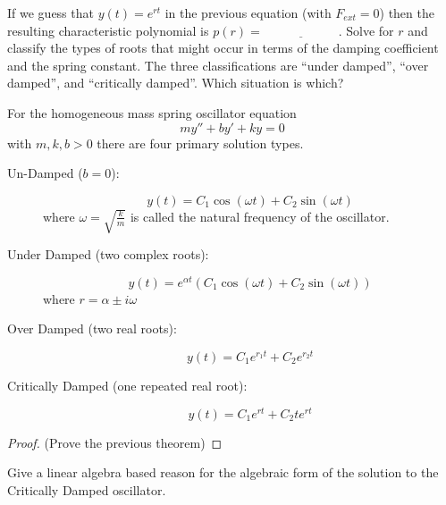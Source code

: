 \begin{problem}
    If we guess that $y(t) = e^{rt}$ in the previous equation (with $F_{ext} = 0$) then
    the resulting characteristic polynomial is $p(r) = \underline{\hspace{1in}}$.  Solve
    for $r$ and classify the types of roots that might occur in terms of the damping
    coefficient and the spring constant.  The three classifications are ``under damped'',
    ``over damped'', and ``critically damped''.  Which situation is which?
\end{problem}


\begin{thm}
    For the homogeneous mass spring oscillator equation 
    \[ my'' + by' + ky = 0 \]
    with $m, k, b > 0$ there are four primary solution types.
    \begin{description}
        \item[Un-Damped ($b = 0$):]
                \[ y(t) = C_1 \cos(\omega t) + C_2 \sin(\omega t) \]
                where $\omega = \sqrt{\frac{k}{m}}$ is called the natural frequency of the
                oscillator.
        \item[Under Damped (two complex roots):] 
            \[ y(t) = e^{\alpha t} \left( C_1 \cos(\omega t) + C_2
                \sin(\omega t) \right) \]
            where $r = \alpha \pm i \omega$
        \item[Over Damped (two real roots):] 
            \[y(t) = C_1 e^{r_1 t} + C_2 e^{r_2 t}\]
        \item[Critically Damped (one repeated real root):] 
            \[ y(t) = C_1 e^{rt} + C_2 t e^{rt} \]
    \end{description}
\end{thm}
\begin{proof}
    (Prove the previous theorem)
\end{proof}

\begin{problem}
    Give a linear algebra based reason for the algebraic  form of the solution to the
    Critically Damped oscillator.
\end{problem}


